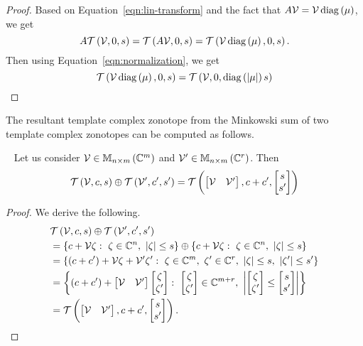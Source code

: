 %
\begin{proof}
Based on Equation~\ref{eqn:lin-transform} and the fact that
$A\mathcal{V}=\mathcal{V}\operatorname{diag}\left(\mu\right)$, we get
%
\[
A\mathit{\operatorname{\mathcal{T}}}\left(\mathcal{V},0,s\right)=\mathit{\operatorname{\mathcal{T}}}\left(A\mathcal{V},0,s\right)=\mathit{\operatorname{\mathcal{T}}}\left(\mathcal{V}\operatorname{diag}\left(\mu\right),0,s\right).
\]
%
Then using Equation~\ref{eqn:normalization}, we get
%
\[
\mathit{\operatorname{\mathcal{T}}}\left(\mathcal{V}\operatorname{diag}\left(\mu\right),0,s\right)=\mathit{\operatorname{\mathcal{T}}}\left(\mathcal{V},0,\operatorname{diag}\left(\left|\mu\right|\right)s\right)
\]
\end{proof}

The resultant template complex zonotope from the Minkowski sum of two
template complex zonotopes can be computed as follows.
%
\begin{lemma}~\label{lem:min-sum}
Let us consider $\mathcal{V}\in\mathbb{M}_{n\times m}\left(\mathbb{C}^m\right)$ and
$\mathcal{V}^\prime\in\mathbb{M}_{n\times m}\left(\mathbb{C}^r\right)$.  Then
%
\begin{equation}
\mathit{\operatorname{\mathcal{T}}}\left(\mathcal{V},c,s\right)\oplus \mathit{\operatorname{\mathcal{T}}}\left(\mathcal{V}^\prime,c^\prime,s^\prime\right)
= \mathit{\operatorname{\mathcal{T}}}\left(\begin{bmatrix}\mathcal{V} & \mathcal{V}^\prime\end{bmatrix},c+c^\prime,\begin{bmatrix}s\\s^\prime\end{bmatrix}\right)
\end{equation}
\end{lemma}
%
\begin{proof}
We derive the following.
%
\begin{align*}
&
  \mathit{\operatorname{\mathcal{T}}}\left(\mathcal{V},c,s\right)\oplus\mathit{\operatorname{\mathcal{T}}}\left(\mathcal{V}^\prime,c^\prime,s^\prime\right)\\
& =
  \left\{c+\mathcal{V}\zeta:~\zeta\in\mathbb{C}^n,~\left|\zeta\right|\leq s\right\}\oplus\left\{c+\mathcal{V}\zeta:~\zeta\in\mathbb{C}^n,~\left|\zeta\right|\leq s\right\}\\
& =
  \left\{\left(c+c^\prime\right)+\mathcal{V}\zeta+\mathcal{V}^\prime\zeta^\prime:~\zeta\in\mathbb{C}^m,~\zeta^\prime\in\mathbb{C}^r,~\left|\zeta\right|\leq s,~\left|\zeta^\prime\right|\leq s^\prime\right\}\\
& =
  \left\{\left(c+c^\prime\right)+\left[\begin{matrix}\mathcal{V}&\mathcal{V}^\prime\end{matrix}\right]\left[\begin{matrix}\zeta\\\zeta^\prime\end{matrix}\right]:~\left[\begin{matrix}\zeta\\\zeta^\prime\end{matrix}\right]\in\mathbb{C}^{m+r},~\left|\left[\begin{matrix}\zeta\\\zeta^\prime\end{matrix}\right]\leq\left[\begin{matrix}s\\s^\prime\end{matrix}\right]\right|\right\}\\
& =  \mathit{\operatorname{\mathcal{T}}}\left(\begin{bmatrix}\mathcal{V} & \mathcal{V}^\prime\end{bmatrix},c+c^\prime,\begin{bmatrix}s\\s^\prime\end{bmatrix}\right).~\hspace{3em}\qedhere
\end{align*}
%
\end{proof}
